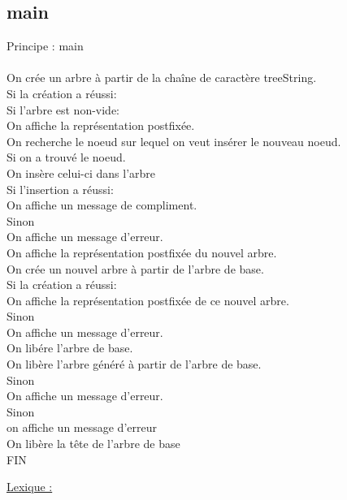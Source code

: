 \documentclass[a4paper]{article}
\newcommand\tab[1][1cm]{\hspace*{#1}}
\begin{document}
\subsection{main}
\begin{algorithm}
Principe : main
\\
\\
\tab On crée un arbre à partir de la chaîne de caractère treeString.
\\
\tab Si la création a réussi:
\\
\tab \tab Si l'arbre est non-vide:
\\
\tab \tab \tab On affiche la représentation postfixée.
\\
\tab \tab \tab On recherche le noeud sur lequel on veut insérer le nouveau noeud.
\\
\tab \tab \tab Si on a trouvé le noeud.
\\
\tab \tab \tab \tab On insère celui-ci dans l'arbre
\\
\tab \tab \tab \tab Si l'insertion a réussi:
\\
\tab \tab \tab \tab \tab On affiche un message de compliment.
\\
\tab \tab \tab \tab Sinon
\\
\tab \tab \tab \tab \tab On affiche un message d'erreur.
\\
\tab \tab \tab On affiche la représentation postfixée du nouvel arbre.
\\
\tab \tab \tab On crée un nouvel arbre à partir de l'arbre de base.
\\
\tab \tab \tab Si la création a réussi:
\\
\tab \tab \tab \tab On affiche la représentation postfixée de ce nouvel arbre.
\\
\tab \tab \tab Sinon
\\
\tab \tab \tab \tab On affiche un message d'erreur.
\\
\tab \tab \tab On libére l'arbre de base.
\\
\tab \tab \tab On libère l'arbre généré à partir de l'arbre de base.
\\
\tab \tab Sinon
\\
\tab \tab \tab On affiche un message d'erreur.
\\
\tab Sinon
\\
\tab \tab on affiche un message d'erreur
\\
\tab On libère la tête de l'arbre de base
\\
FIN
\end{algorithm}
\underline{Lexique :}
\end{document}
